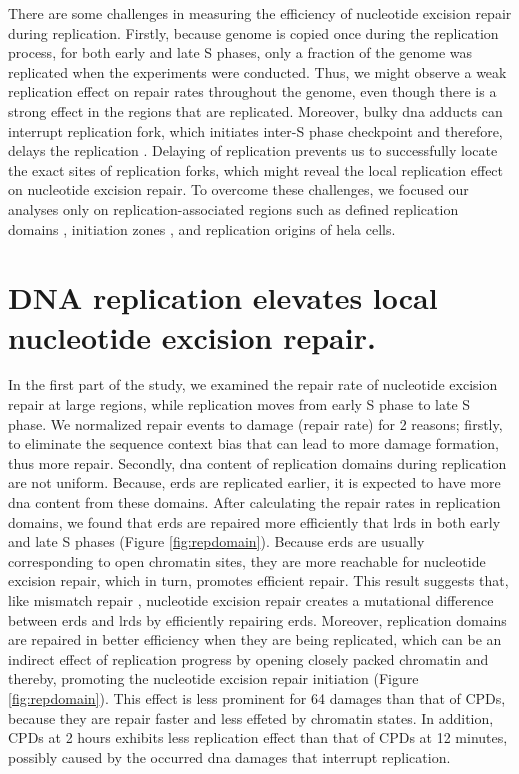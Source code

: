 There are some challenges in measuring the efficiency of nucleotide excision repair during replication. Firstly, because genome is copied once during the replication process, for both early and late S phases, only a fraction of the genome was replicated when the experiments were conducted. Thus, we might observe a weak replication effect on repair rates throughout the genome, even though there is a strong effect in the regions that are replicated. Moreover, bulky \gls{dna} adducts can interrupt replication fork, which initiates inter-S phase checkpoint and therefore, delays the replication \citep{minca2011replication}. Delaying of replication prevents us to successfully locate the exact sites of replication forks, which might reveal the local replication effect on nucleotide excision repair. To overcome these challenges, we focused our analyses only on replication-associated regions such as defined replication domains \citep{liu2016novo}, initiation zones \citep{petryk2016replication}, and replication origins \citep{besnard2012unraveling} of \gls{hela} cells.     

\section{DNA replication elevates local nucleotide excision repair.}

In the first part of the study, we examined the repair rate of nucleotide excision repair at large regions, while replication moves from early S phase to late S phase. We normalized repair events to damage (repair rate) for 2 reasons; firstly, to eliminate the sequence context bias that can lead to more damage formation, thus more repair. Secondly, \gls{dna} content of replication domains during replication are not uniform. Because, \gls{erd}s are replicated earlier, it is expected to have more \gls{dna} content from these domains. After calculating the repair rates in replication domains, we found that \gls{erd}s are repaired more efficiently that \gls{lrd}s in both early and late S phases (Figure \ref{fig:repdomain}). Because \gls{erd}s are usually corresponding to open chromatin sites, they are more reachable for nucleotide excision repair, which in turn, promotes efficient repair. This result suggests that, like mismatch repair \citep{supek2015differential}, nucleotide excision repair creates a mutational difference between \gls{erd}s and \gls{lrd}s by efficiently repairing \gls{erd}s. Moreover, replication domains are repaired in better efficiency when they are being replicated, which can be an indirect effect of replication progress by opening closely packed chromatin and thereby, promoting the nucleotide excision repair initiation (Figure \ref{fig:repdomain}). This effect is less prominent for \gls{64} damages than that of \gls{CPD}s, because they are repair faster and less effeted by chromatin states. In addition, \gls{CPD}s at 2 hours exhibits less replication effect than that of \gls{CPD}s at 12 minutes, possibly caused by the occurred \gls{dna} damages that interrupt replication. 

